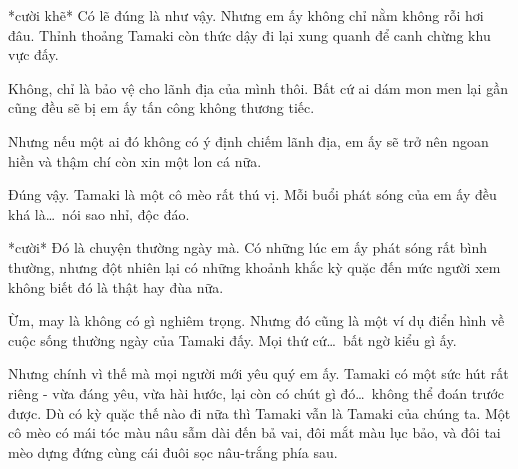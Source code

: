 \documentclass[../main.tex]{subfiles}
\begin{document}

*cười khẽ* Có lẽ đúng là như vậy. Nhưng em ấy không chỉ nằm không rỗi hơi đâu. Thỉnh thoảng Tamaki còn thức dậy đi lại xung quanh để canh chừng khu vực đấy.


Không, chỉ là bảo vệ cho lãnh địa của mình thôi. Bất cứ ai dám mon men lại gần cũng đều sẽ bị em ấy tấn công không thương tiếc.


Nhưng nếu một ai đó không có ý định chiếm lãnh địa, em ấy sẽ trở nên ngoan hiền và thậm chí còn xin một lon cá nữa.



Đúng vậy. Tamaki là một cô mèo rất thú vị. Mỗi buổi phát sóng của em ấy đều khá là\dots\ nói sao nhỉ, độc đáo.


*cười* Đó là chuyện thường ngày mà. Có những lúc em ấy phát sóng rất bình thường, nhưng đột nhiên lại có những khoảnh khắc kỳ quặc đến mức người xem không biết đó là thật hay đùa nữa.


Ừm, may là không có gì nghiêm trọng. Nhưng đó cũng là một ví dụ điển hình về cuộc sống thường ngày của Tamaki đấy. Mọi thứ cứ\dots\ bất ngờ kiểu gì ấy.


Nhưng chính vì thế mà mọi người mới yêu quý em ấy. Tamaki có một sức hút rất riêng - vừa đáng yêu, vừa hài hước, lại còn có chút gì đó\dots\ không thể đoán trước được. Dù có kỳ quặc thế nào đi nữa thì Tamaki vẫn là Tamaki của chúng ta. Một cô mèo có mái tóc màu nâu sẫm dài đến bả vai, đôi mắt màu lục bảo, và đôi tai mèo dựng đứng cùng cái đuôi sọc nâu-trắng phía sau.

\end{document}
